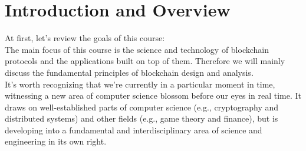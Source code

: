 \chapter{Introduction and Overview}

At first, let's review the goals of this course:\\
The main focus of this course is the science and technology of blockchain protocols and the applications built on top of them. Therefore we will mainly discuss the fundamental principles of blockchain design and analysis.\\
 It’s worth recognizing that we’re currently in a particular moment
in time, witnessing a new area of computer science blossom before our eyes in real time. It draws on well-established parts of computer science (e.g., cryptography and distributed systems) and other fields (e.g., game theory and finance), but is developing into a fundamental and interdisciplinary area of science and engineering in its own right.

